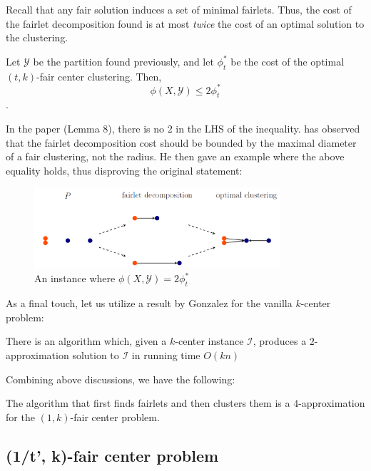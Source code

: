 Recall that any fair solution induces a set of minimal fairlets. Thus, the cost of the fairlet decomposition found is at most {\it twice} the cost of an optimal solution to the clustering.
	
\begin{lemma}
Let $\mathcal{Y}$ be the partition found previously, and let $\phi_t^*$ be the cost of the optimal $(t, k)$-fair center clustering. Then,
$$\phi(X, \mathcal{Y}) \leq 2 \phi_t^*$$.
\end{lemma}

\begin{remark}
In the paper (Lemma 8), there is no $2$ in the LHS of the inequality.  \cite{Rosner2019} has observed that the fairlet decomposition cost should be bounded by the maximal diameter of a fair clustering, not the radius.
He then gave an example where the above equality holds, thus disproving the original statement:
\begin{figure}[hbt!]
	\centering
	\includegraphics[height=3cm]{results/fig/correction.png}
	\caption{An instance where $\phi(X, \mathcal{Y}) = 2 \phi_t^*$}
\end{figure}
\end{remark}

	
As a final touch, let us utilize a result by Gonzalez for the vanilla $k$-center problem\cite{Gonzalez1985}:

\begin{theorem}[Gonzalez, 1985]
There is an algorithm which, given a $k$-center instance $\mathcal{I}$, produces a $2$-approximation solution to $\mathcal{I}$ in running time $O(kn)$
\end{theorem}

\noindent Combining above discussions, we have the following:

\begin{theorem}
The algorithm that first finds fairlets and then clusters them is a $4$-approximation for the $(1, k)$-fair center problem.
\end{theorem}


\subsection{(1/t', k)-fair center problem}


